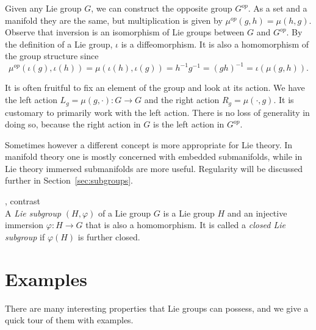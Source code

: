 Given any Lie group $G$, we can construct the opposite group $G^{op}$.
As a set and a manifold they are the same, but multiplication is given by $\mu^{op}(g,h) = \mu(h,g)$.
Observe that inversion is an isomorphism of Lie groups between $G$ and $G^{op}$.
By the definition of a Lie group, $\iota$ is a diffeomorphism.
It is also a homomorphism of the group structure since
\[
\mu^{op}(\iota(g),\iota(h))
= \mu(\iota(h),\iota(g))
= h^{-1}g^{-1}
= (gh)^{-1}
= \iota(\mu(g,h)).
\]

It is often fruitful to fix an element of the group and look at its action.
We have the left action $L_g = \mu(g,\cdot) : G \to G$ and the right action $R_g = \mu(\cdot,g)$.
It is customary to primarily work with the left action.
There is no loss of generality in doing so, because the right action in $G$ is the left action in $G^{op}$.

Sometimes however a different concept is more appropriate for Lie theory.
In manifold theory one is mostly concerned with embedded submanifolds, while in Lie theory immersed submanifolds are more useful.
Regularity will be discussed further in Section~\ref{sec:subgroups}.
\begin{definition}\label{Def:subgroup}
\textup{\cite[3.17]{Warner1983}, contrast~\cite[\S{}7.1]{Fulton2004}}\\
A \emph{Lie subgroup} $(H,\varphi)$ of a Lie group $G$ is a Lie group $H$ and an injective immersion $\varphi : H \to G$ that is also a homomorphism.
It is called a \emph{closed Lie subgroup} if $\varphi(H)$ is further closed.
\end{definition}






\section{Examples}
\label{sec:examples}

There are many interesting properties that Lie groups can possess, and we give a quick tour of them with examples.

